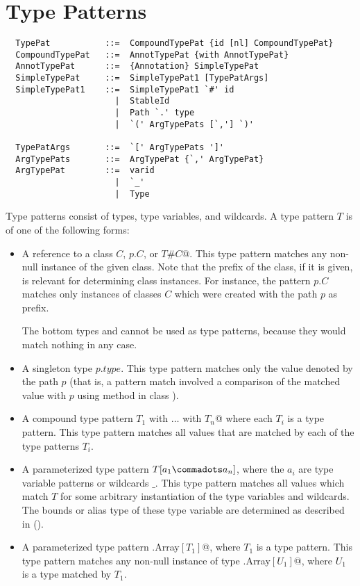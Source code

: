 
\section{Type Patterns}\label{sec:type-patterns}

\syntax\begin{lstlisting}
  TypePat           ::=  CompoundTypePat {id [nl] CompoundTypePat}
  CompoundTypePat   ::=  AnnotTypePat {with AnnotTypePat}
  AnnotTypePat      ::=  {Annotation} SimpleTypePat
  SimpleTypePat     ::=  SimpleTypePat1 [TypePatArgs]
  SimpleTypePat1    ::=  SimpleTypePat1 `#' id
                      |  StableId 
                      |  Path `.' type
                      |  `(' ArgTypePats [`,'] `)'
 
  TypePatArgs       ::=  `[' ArgTypePats ']'
  ArgTypePats       ::=  ArgTypePat {`,' ArgTypePat}
  ArgTypePat        ::=  varid 
                      |  `_' 
                      |  Type
\end{lstlisting}
Type patterns consist of types, type variables, and wildcards. 
A type pattern $T$ is of one of the following  forms:
\begin{itemize}
\item A reference to a class $C$, $p.C$, or \lstinline@$T$#$C$@.  This
type pattern matches any non-null instance of the given class. 
Note that the prefix of the class, if it is given, is relevant for determining
class instances. For instance, the pattern $p.C$ matches only
instances of classes $C$ which were created with the path $p$ as
prefix.

The bottom types  and  cannot
be used as type patterns, because they would match nothing in any case.  
\item
A singleton type $p.type$. This type pattern matches only the value
denoted by the path $p$ (that is, a pattern match involved a
comparison of the matched value with $p$ using method  in class
).
\item
A compound type pattern \lstinline@$T_1$ with $\ldots$ with $T_n$@ where each $T_i$ is a
type pattern. This type pattern matches all values that are matched by each of
the type patterns $T_i$.
\item 
A parameterized type pattern $T[a_1 \commadots a_n]$, where the $a_i$
are type variable patterns or wildcards $\_$. 
This type pattern matches all values which match $T$ for
some arbitrary instantiation of the type variables and wildcards. The
bounds or alias type of these type variable are determined as
described in ().
\item
A parameterized type pattern \lstinline@scala.Array$[T_1]$@, where
$T_1$ is a type pattern. This type pattern matches any non-null instance
of type \lstinline@scala.Array$[U_1]$@, where $U_1$ is a type matched by $T_1$.
\end{itemize}
